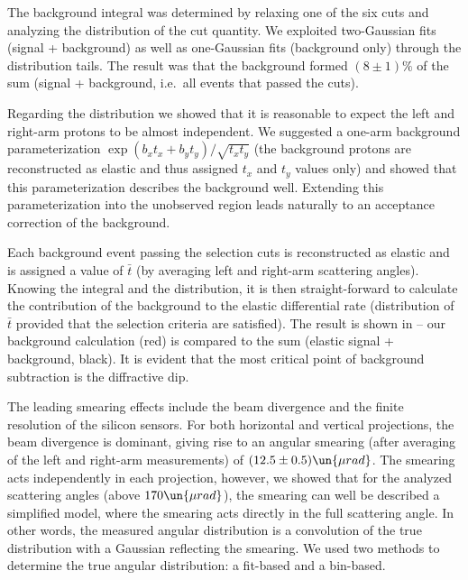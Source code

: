 The background integral was determined by relaxing one of the six cuts and analyzing the distribution of the cut quantity. We exploited two-Gaussian fits (signal + background) as well as one-Gaussian fits (background only) through the distribution tails. The result was that the background formed $(8\pm 1)\percent$ of the sum (signal + background, i.e.~all events that passed the cuts).

Regarding the distribution we showed that it is reasonable to expect the left and right-arm protons to be almost independent. We suggested a one-arm background parameterization $\exp(b_x t_x + b_y t_y) / \sqrt{t_x t_y}$ (the background protons are reconstructed as elastic and thus assigned $t_x$ and $t_y$ values only) and showed that this parameterization describes the background well. Extending this parameterization into the unobserved region leads naturally to an acceptance correction of the background.

Each background event passing the selection cuts is reconstructed as elastic and is assigned a value of $\bar t$ (by averaging left and right-arm scattering angles). Knowing the integral and the distribution, it is then straight-forward to calculate the contribution of the background to the elastic differential rate (distribution of $\bar t$ provided that the selection criteria are satisfied). The result is shown in  -- our background calculation (red) is compared to the sum (elastic signal + background, black). It is evident that the most critical point of background subtraction is the diffractive dip.


\bmfig
{}
%
\emfig

The leading smearing effects include the beam divergence and the finite resolution of the silicon sensors. For both horizontal and vertical projections, the beam divergence is dominant, giving rise to an angular smearing (after averaging of the left and right-arm measurements) of $(12.5 \pm 0.5)\un{\mu rad}$. The smearing acts independently in each projection, however, we showed that for the analyzed scattering angles (above $170\un{\mu rad}$), the smearing can well be described a simplified model, where the smearing acts directly in the full scattering angle. In other words, the measured angular distribution is a convolution of the true distribution with a Gaussian reflecting the smearing. We used two methods to determine the true angular distribution: a fit-based and a bin-based.

